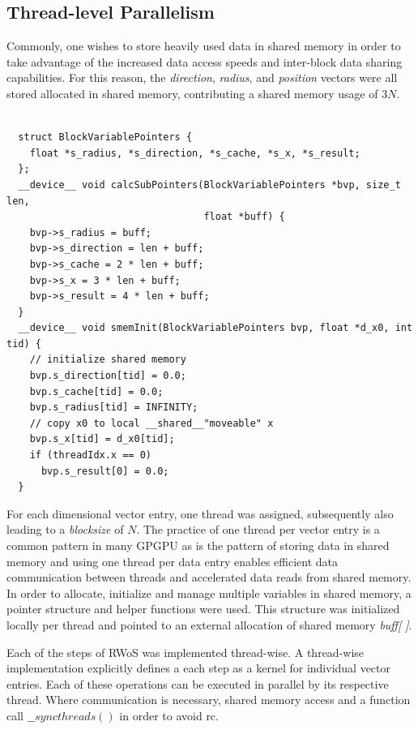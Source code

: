 \subsection{Thread-level Parallelism}\label{tlp}
Commonly, one wishes to store heavily used data in shared memory in order to
take advantage of the increased data access speeds and inter-block data sharing
capabilities.  For this reason, the \textit{direction}, \textit{radius}, and \textit{position}
vectors were all stored allocated in shared memory, contributing a shared memory usage of
$3N$.
\begin{lstlisting}[caption="src/wos\_native.cuh",label=BlockVariablePointers]

  struct BlockVariablePointers {
    float *s_radius, *s_direction, *s_cache, *s_x, *s_result;
  };
  __device__ void calcSubPointers(BlockVariablePointers *bvp, size_t len,
                                  float *buff) {
    bvp->s_radius = buff;
    bvp->s_direction = len + buff;
    bvp->s_cache = 2 * len + buff;
    bvp->s_x = 3 * len + buff;
    bvp->s_result = 4 * len + buff;
  }
  __device__ void smemInit(BlockVariablePointers bvp, float *d_x0, int tid) {
    // initialize shared memory
    bvp.s_direction[tid] = 0.0;
    bvp.s_cache[tid] = 0.0;
    bvp.s_radius[tid] = INFINITY;
    // copy x0 to local __shared__"moveable" x
    bvp.s_x[tid] = d_x0[tid];
    if (threadIdx.x == 0)
      bvp.s_result[0] = 0.0;
  }
\end{lstlisting}

For each dimensional vector entry, one thread was assigned, subsequently
also leading to a \textit{blocksize} of $N$.  The practice of one thread per vector
entry is a common pattern in many \gls{GPGPU} as is the pattern of storing data in shared
memory and using one thread per data entry enables efficient data communication
between threads and accelerated data reads from shared memory. In order to allocate,
 initialize and manage multiple variables in shared memory, a pointer structure and helper functions
were used.  This structure was initialized locally per thread and pointed to an
external allocation of shared memory \textit{buff[ ]}.

Each of the steps of \Gls{RWoS} was implemented thread-wise.  A thread-wise implementation
explicitly defines a each step as a kernel for individual vector entries.  Each of these operations
can be executed in parallel by its respective thread.  Where communication is necessary,
shared memory access and a function call $\_\_syncthreads()$ in order to avoid \Gls{rc}.

